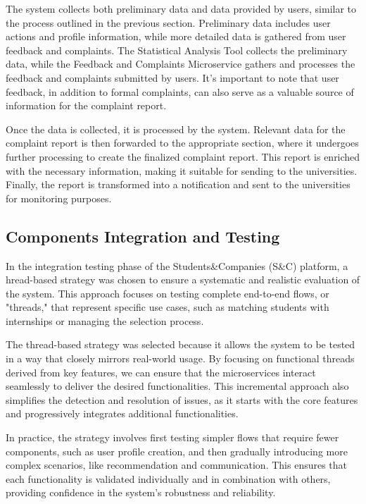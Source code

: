 The system collects both preliminary data and data provided by users, similar to the process outlined
in the previous section. Preliminary data includes user actions and profile information, while more
detailed data is gathered from user feedback and complaints. The Statistical Analysis Tool collects
the preliminary data, while the Feedback and Complaints Microservice gathers and processes the
feedback and complaints submitted by users. It’s important to note that user feedback, in addition
to formal complaints, can also serve as a valuable source of information for the complaint report.

Once the data is collected, it is processed by the system. Relevant data for the complaint report is
then forwarded to the appropriate section, where it undergoes further processing to create the
finalized complaint report. This report is enriched with the necessary information, making it
suitable for sending to the universities. Finally, the report is transformed into a notification
and sent to the universities for monitoring purposes.

\newpage
\subsection{Components Integration and Testing}

In the integration testing phase of the Students\&Companies (S\&C) platform, a hread-based strategy
was chosen to ensure a systematic and realistic evaluation of the system. This approach focuses on
testing complete end-to-end flows, or "threads," that represent specific use cases, such as matching
students with internships or managing the selection process. 

The thread-based strategy was selected because it allows the system to be tested in a way that
closely mirrors real-world usage. By focusing on functional threads derived from key features,
we can ensure that the microservices interact seamlessly to deliver the desired functionalities.
This incremental approach also simplifies the detection and resolution of issues, as it starts
with the core features and progressively integrates additional functionalities.

In practice, the strategy involves first testing simpler flows that require fewer components,
such as user profile creation, and then gradually introducing more complex scenarios,
like recommendation and communication. This ensures that each functionality is validated
individually and in combination with others, providing confidence in the system’s robustness
and reliability.

